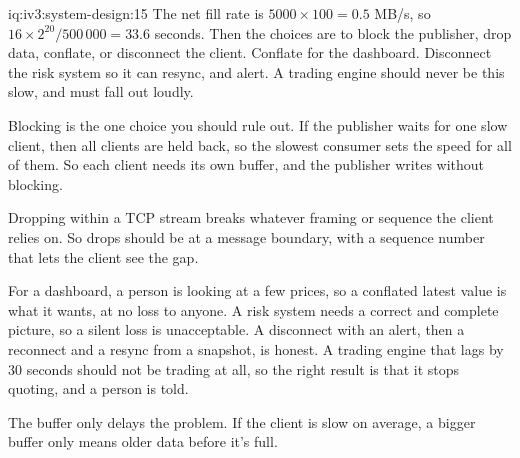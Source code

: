 \begin{solution}{iq:iv3:system-design:15}
The net fill rate is $5000 \times 100 = 0.5$ MB/s, so $16 \times 2^{20} / 500\,000 = 33.6$ seconds. Then the choices are to block the publisher, drop data, conflate, or disconnect the client. Conflate for the dashboard. Disconnect the risk system so it can resync, and alert. A trading engine should never be this slow, and must fall out loudly.

Blocking is the one choice you should rule out. If the publisher waits for one slow client, then all clients are held back, so the slowest consumer sets the speed for all of them. So each client needs its own buffer, and the publisher writes without blocking.

Dropping within a TCP stream breaks whatever framing or sequence the client relies on. So drops should be at a message boundary, with a sequence number that lets the client see the gap.

For a dashboard, a person is looking at a few prices, so a conflated latest value is what it wants, at no loss to anyone. A risk system needs a correct and complete picture, so a silent loss is unacceptable. A disconnect with an alert, then a reconnect and a resync from a snapshot, is honest. A trading engine that lags by 30 seconds should not be trading at all, so the right result is that it stops quoting, and a person is told.

The buffer only delays the problem. If the client is slow on average, a bigger buffer only means older data before it's full.

\end{solution}

